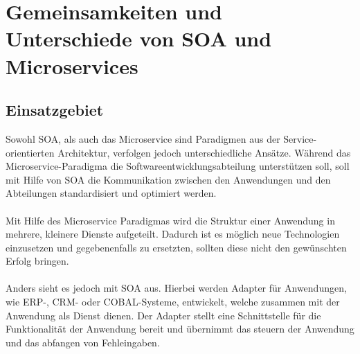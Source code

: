\chapter[Gemeinsamkeiten und Unterschiede]{Gemeinsamkeiten und Unterschiede von SOA und Microservices}
\label{chap:Unterschiede}

\section{Einsatzgebiet}
\label{sec:Einsatzgebiet}
Sowohl SOA, als auch das Microservice sind Paradigmen aus der Service-orientierten Architektur, verfolgen jedoch unterschiedliche Ansätze. Während das Microservice-Paradigma die Softwareentwicklungsabteilung unterstützen soll, soll mit Hilfe von SOA die Kommunikation zwischen den Anwendungen und den Abteilungen standardisiert und optimiert werden.
\\\\
Mit Hilfe des Microservice Paradigmas wird die Struktur einer Anwendung in mehrere, kleinere Dienste aufgeteilt. Dadurch ist es möglich neue Technologien einzusetzen und gegebenenfalls zu ersetzten, sollten diese nicht den gewünschten Erfolg bringen.
\\\\
Anders sieht es jedoch mit SOA aus. Hierbei werden Adapter für Anwendungen, wie ERP-, CRM- oder COBAL-Systeme, entwickelt, welche zusammen mit der Anwendung als Dienst dienen. Der Adapter stellt eine Schnittstelle für die Funktionalität der Anwendung bereit und übernimmt das steuern der Anwendung und das abfangen von Fehleingaben.

